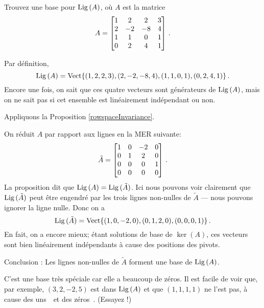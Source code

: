 \begin{myprob}\label{rowspace1}  Trouvez une base pour $\operatorname{Lig\,}(A)$, où $A$ est la matrice
$$
A = \left[ \begin{matrix} 
1&2&2&3\\2&-2&-8&4\\1&1&0&1\\0&2&4&1 \end{matrix} \right]\,.
$$

\begin{mysol} 
Par définition, 
$$
\operatorname{Lig\,}(A) = \operatorname{ Vect} \normalsize\{(1,2,2,3),(2,-2,-8,4),(1,1,0,1),(0,2,4,1)\normalsize\}\,.
$$
Encore une fois, on sait que ces quatre vecteurs sont générateurs de $\operatorname{Lig\,}(A)$, mais on ne sait pas si cet ensemble est linéairement indépendant ou non.

Appliquons la Proposition \ref{rowspaceInvariance}. 

On réduit $A$ par rapport aux lignes en la MER suivante:
$$
\tilde A=\left[ \begin{matrix} 1 & 0 & -2 & 0\\ 0 & 1 & 2 & 0\\ 0 & 0 & 0 & 1\\ 0 & 0 & 0 & 0 \end{matrix} \right]\,.
$$
La proposition dit que $\operatorname{Lig\,}(A) = \operatorname{Lig\,}(\tilde A)$.  Ici nous pouvons voir clairement que $\operatorname{Lig\,}(\tilde A)$ peut \^etre engendr\'e par les trois lignes non-nulles de $\tilde A$ --- nous pouvons ignorer la ligne nulle. Donc on a
$$
\operatorname{Lig\,}(\tilde A) = \textrm{Vect}\{ (1,0,-2,0), (0,1,2,0), (0,0,0,1)\}\,.
$$
En fait, on a encore mieux; étant solutions de base de $\ker(A)$, ces
vecteurs sont bien linéairement indépendants à cause des positions des pivots.  

Conclusion : Les lignes non-nulles de $\tilde A$ forment une base de $\operatorname{Lig\,}(A)$.

C'est une base tr\`es spéciale car elle a beaucoup de zéros. Il est facile de voir
que, par exemple, $(3,2,-2,5)$ est dans $\operatorname{Lig\,}(A)$ et que $(1,1,1,1)$ ne l'est pas, à cause des \og uns\ \fg\  et des \og zéros\ \fg.  (Essayez !)
\end{mysol}\end{myprob}



